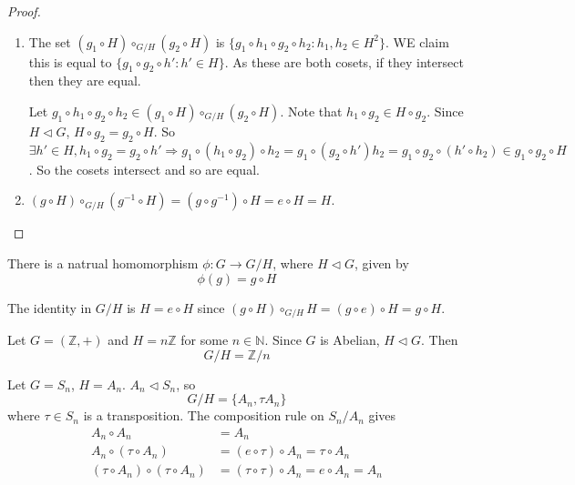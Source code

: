\begin{proof}
	\hfill
	\begin{enumerate}
		\item The set $(g_1 \circ H) \circ_{G / H} (g_2 \circ H)$ is $\{ g_1 \circ h_1 \circ g_2 \circ h_2: h_1, h_2 \in H^2 \}$. WE claim this is equal to $\{ g_1 \circ g_2 \circ h': h' \in H \}$. As these are both cosets, if they intersect then they are equal.
		
		Let $g_1 \circ h_1 \circ g_2 \circ h_2 \in (g_1 \circ H) \circ_{G / H} (g_2 \circ H)$. Note that $h_1 \circ g_2 \in H \circ g_2$. Since $H \triangleleft G$, $H \circ g_2 = g_2 \circ H$. So $\exists h' \in H, h_1 \circ g_2 = g_2 \circ h' \Longrightarrow g_1 \circ (h_1 \circ g_2) \circ h_2 = g_1 \circ (g_2 \circ h') h_2 = g_1 \circ g_2 \circ (h' \circ h_2) \in g_1 \circ g_2 \circ H$. So the cosets intersect and so are equal.
		\item $(g \circ H) \circ_{G / H} (g^{-1} \circ H) = (g \circ g^{-1}) \circ H = e \circ H = H$.
	\end{enumerate}
\end{proof}

\begin{remark}
	There is a natrual homomorphism $\phi: G \rightarrow G / H$, where $H \triangleleft G$, given by
	\[
		\phi(g) = g \circ H
	\]
\end{remark}

\begin{remark}
	The identity in $G / H$ is $H = e \circ H$ since $(g \circ H) \circ_{G / H} H = (g \circ e) \circ H = g \circ H$.
\end{remark}

\begin{example}\label{exa:quotientGroup1}
	Let $G = (\mathbb{Z}, +)$ and $H = n \mathbb{Z}$ for some $n \in \mathbb{N}$. Since $G$ is Abelian, $H \triangleleft G$. Then
	\[
		G / H = \mathbb{Z} / n
	\]
\end{example}

\begin{example}\label{exa:quotientGroup2}
	Let $G = S_n$, $H = A_n$. $A_n \triangleleft S_n$, so
	\[
		G / H = \{ A_n, \tau A_n \}
	\]
	where $\tau \in S_n$ is a transposition. The composition rule on $S_n / A_n$ gives
	\[
		\begin{aligned}
			A_n \circ A_n & = A_n \\
			A_n \circ (\tau \circ A_n) & = (e \circ \tau) \circ A_n = \tau \circ A_n \\
			(\tau \circ A_n) \circ (\tau \circ A_n) & = (\tau \circ \tau) \circ A_n = e \circ A_n = A_n
		\end{aligned}
	\]
\end{example}

